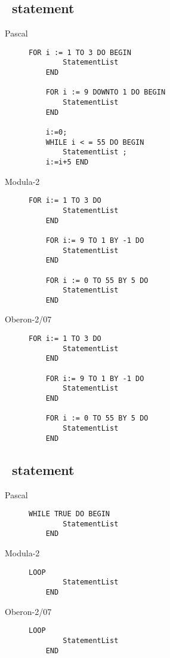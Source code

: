 \documentclass[10pt]{article}
\begin{document}
\subsection{\FOR\ statement}

\begin{description}
    \item[Pascal] 
    \begin{lstlisting}[style=example]   
    FOR i := 1 TO 3 DO BEGIN 
        StatementList
    END
    
    FOR i := 9 DOWNTO 1 DO BEGIN 
        StatementList
    END

    i:=0;
    WHILE i < = 55 DO BEGIN
        StatementList ;
    i:=i+5 END    
    \end{lstlisting}
    
    \item[Modula-2] 
    \begin{lstlisting}[style=example]   
    FOR i:= 1 TO 3 DO 
        StatementList
    END

    FOR i:= 9 TO 1 BY -1 DO
        StatementList
    END

    FOR i := 0 TO 55 BY 5 DO
        StatementList
    END
    \end{lstlisting}
    
    \item[Oberon-2/07] 
    \begin{lstlisting}[style=example]   
    FOR i:= 1 TO 3 DO 
        StatementList
    END

    FOR i:= 9 TO 1 BY -1 DO
        StatementList
    END

    FOR i := 0 TO 55 BY 5 DO
        StatementList
    END
    \end{lstlisting}
\end{description}

\subsection{\LOOP\ statement}

\begin{description}
    \item[Pascal] 
    \begin{lstlisting}[style=example]   
    WHILE TRUE DO BEGIN 
        StatementList
    END      
    \end{lstlisting}
    
    \item[Modula-2] 
    \begin{lstlisting}[style=example]   
    LOOP 
        StatementList
    END    
    \end{lstlisting}
    
    \item[Oberon-2/07] 
    \begin{lstlisting}[style=example]   
    LOOP 
        StatementList
    END 
    \end{lstlisting}
\end{description}
\end{document}
